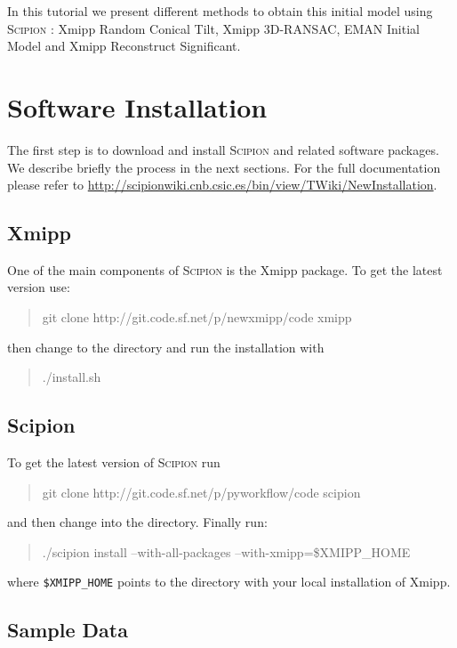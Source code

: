 \documentclass[12pt]{article} %
\newcommand{\scipion}{\textsc{Scipion} }
\newenvironment{command}{\tt\begin{quote}}{\end{quote}}
\begin{document}
In this tutorial we present different methods to obtain this initial
model using \scipion: Xmipp Random Conical Tilt, Xmipp 3D-RANSAC, EMAN
Initial Model and Xmipp Reconstruct Significant.

\section{Software Installation}

The first step is to download and install \scipion and related
software packages. We describe briefly the process in the next
sections. For the full documentation please refer to
\url{http://scipionwiki.cnb.csic.es/bin/view/TWiki/NewInstallation}.

\subsection{Xmipp}

One of the main components of \scipion is the Xmipp package. To get
the latest version use:

\begin{command}
git clone http://git.code.sf.net/p/newxmipp/code xmipp
\end{command}

\noindent
then change to the  directory and run the installation with

\begin{command}
./install.sh
\end{command}

\subsection{Scipion}

To get the latest version of \scipion run

\begin{command}
git clone http://git.code.sf.net/p/pyworkflow/code scipion
\end{command}

\noindent
and then change into the  directory. Finally run:

\begin{command}
./scipion install --with-all-packages --with-xmipp=\$XMIPP\_HOME
\end{command}

\noindent
where \verb+$XMIPP_HOME+ points to the directory with your local
installation of Xmipp.

\subsection{Sample Data}
\end{document}
